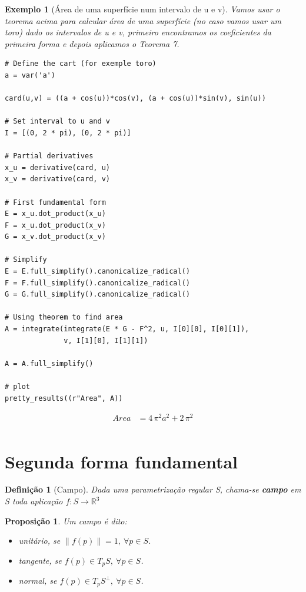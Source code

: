 \documentclass[12pt]{article}
\newtheorem{prop}{Proposição}
\newtheorem{ex}{Exemplo}[section]
\newtheorem{definition}{Definição}
\begin{document}
\begin{ex}[Área de uma superfície num intervalo de u e v]
Vamos usar o teorema acima para calcular área de uma superfície (no caso vamos usar um toro) dado os intervalos de u e v, primeiro encontramos os coeficientes da primeira forma e depois aplicamos o Teorema 7.

\begin{lstlisting}
# Define the cart (for exemple toro)
a = var('a')

card(u,v) = ((a + cos(u))*cos(v), (a + cos(u))*sin(v), sin(u))

# Set interval to u and v
I = [(0, 2 * pi), (0, 2 * pi)]

# Partial derivatives
x_u = derivative(card, u)
x_v = derivative(card, v)

# First fundamental form
E = x_u.dot_product(x_u)
F = x_u.dot_product(x_v)
G = x_v.dot_product(x_v)

# Simplify
E = E.full_simplify().canonicalize_radical()
F = F.full_simplify().canonicalize_radical()
G = G.full_simplify().canonicalize_radical()

# Using theorem to find area
A = integrate(integrate(E * G - F^2, u, I[0][0], I[0][1]), 
              v, I[1][0], I[1][1])

A = A.full_simplify()

# plot
pretty_results((r"Area", A))
\end{lstlisting}

\begin{align*} Area &= 4 \, \pi^{2} a^{2} + 2 \, \pi^{2} \\ \end{align*}
\end{ex}

\section*{Segunda forma fundamental}

\begin{definition}[Campo]
Dada uma parametrização regular S, chama-se \textbf{campo} em S toda aplicação $f: S \to \mathbb{R}^3$
\end{definition}

\begin{prop} Um campo é dito:
\begin{itemize}
    \item unitário, se $\| f(p) \| = 1,\ \forall p \in S$.
    
    \item tangente, se $f(p) \in T_p S,\ \forall p \in S$.
    
    \item normal, se $f(p) \in T_p S^\perp,\ \forall p \in S$.
\end{itemize}
\end{prop}
\end{document}
